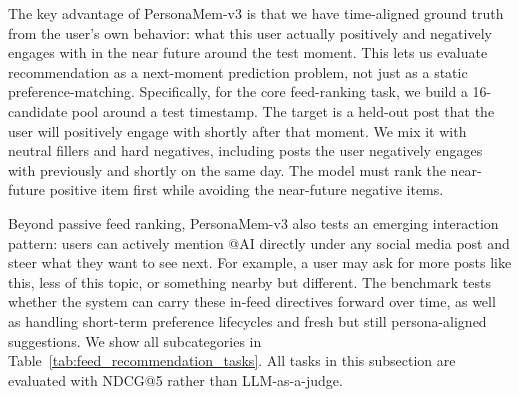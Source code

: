 \documentclass[]{fairmeta}
\begin{document}
The key advantage of PersonaMem-v3 is that we have time-aligned ground truth from the user's own behavior: what this user actually positively and negatively engages with in the near future around the test moment. This lets us evaluate recommendation as a next-moment prediction problem, not just as a static preference-matching. Specifically, for the core feed-ranking task, we build a 16-candidate pool around a test timestamp. The target is a held-out post that the user will positively engage with shortly after that moment. We mix it with neutral fillers and hard negatives, including posts the user negatively engages with previously and shortly on the same day. The model must rank the near-future positive item first while avoiding the near-future negative items.

Beyond passive feed ranking, PersonaMem-v3 also tests an emerging interaction pattern: users can actively mention @AI directly under any social media post and steer what they want to see next. For example, a user may ask for more posts like this, less of this topic, or something nearby but different. The benchmark tests whether the system can carry these in-feed directives forward over time, as well as handling short-term preference lifecycles and fresh but still persona-aligned suggestions. We show all subcategories in Table~\ref{tab:feed_recommendation_tasks}. All tasks in this subsection are evaluated with NDCG@5 rather than LLM-as-a-judge.
\end{document}
